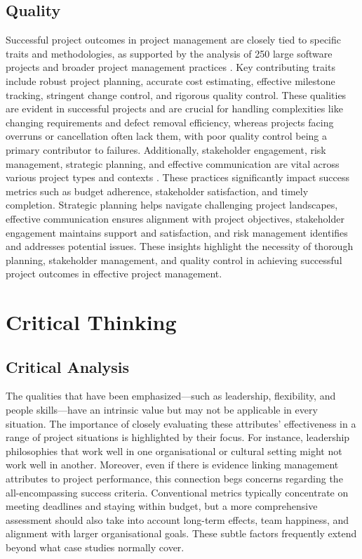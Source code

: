 \documentclass{article}
\begin{document}
\subsection{Quality}

Successful project outcomes in project management are closely tied to specific traits and methodologies, as supported by the analysis of 250 large software projects and broader project management practices \cite{jones2004software}. Key contributing traits include robust project planning, accurate cost estimating, effective milestone tracking, stringent change control, and rigorous quality control. These qualities are evident in successful projects and are crucial for handling complexities like changing requirements and defect removal efficiency, whereas projects facing overruns or cancellation often lack them, with poor quality control being a primary contributor to failures. Additionally, stakeholder engagement, risk management, strategic planning, and effective communication are vital across various project types and contexts \cite{fernandes2013identifying}. These practices significantly impact success metrics such as budget adherence, stakeholder satisfaction, and timely completion. Strategic planning helps navigate challenging project landscapes, effective communication ensures alignment with project objectives, stakeholder engagement maintains support and satisfaction, and risk management identifies and addresses potential issues. These insights highlight the necessity of thorough planning, stakeholder management, and quality control in achieving successful project outcomes in effective project management.

\section{Critical Thinking}

\subsection{Critical Analysis}

The qualities that have been emphasized—such as leadership, flexibility, and people skills—have an intrinsic value but may not be applicable in every situation. The importance of closely evaluating these attributes' effectiveness in a range of project situations is highlighted by their focus. For instance, leadership philosophies that work well in one organisational or cultural setting might not work well in another. Moreover, even if there is evidence linking management attributes to project performance, this connection begs concerns regarding the all-encompassing success criteria. Conventional metrics typically concentrate on meeting deadlines and staying within budget, but a more comprehensive assessment should also take into account long-term effects, team happiness, and alignment with larger organisational goals. These subtle factors frequently extend beyond what case studies normally cover.
\end{document}
